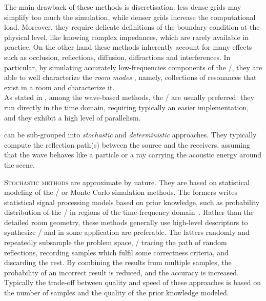 \mynewline
The main drawback of these methods is discretisation:
less dense grids may simplify too much the simulation, while denser grids increase the computational load.
Moreover, they require delicate definitions of the boundary condition at the physical level,
like knowing complex impedances, which are rarely available in practice.
On the other hand these methods inherently account for many effects such as occlusion, reflections, diffusion, diffractions and interferences.
In particular, by simulating accurately low-frequencies components of the \RIR/, they are able to well characterize the \textit{room modes}
,
namely, collections of resonances that exist in a room and characterize it.
\\As stated in , among the wave-based methods, the \DWMs/ are usually preferred:
they run directly in the time domain, requiring typically an easier implementation, and they exhibit a high level of parallelism.

 can be sub-grouped into \textit{stochastic} and \textit{deterministic} approaches.
They typically compute the reflection path(s) between the source and the receivers,
assuming that the wave behaves like a particle or a ray carrying the acoustic energy around the scene.

\mynewline
\textsc{Stochastic methods} are approximate by nature.
They are based on statistical modeling of the \RIRs/ or Monte Carlo simulation methods.
The formers writes statistical signal processing models based on prior knowledge,
such as probability distribution of the \RIR/ in regions of the time-frequency domain~.
Rather than the detailed room geometry, these methods generally use high-level descriptors
to synthesize \RIRs/ and in some application are preferable.
The latters randomly and repeatedly subsample the problem space, \eg/ tracing the path of random reflections,
recording samples which fulfil some correctness criteria, and discarding the rest.
By combining the results from multiple samples, the probability of an incorrect result is reduced, and the accuracy is increased.
Typically the trade-off between quality and speed of these approaches is based on the number of samples and
the quality of the prior knowledge modeled.

